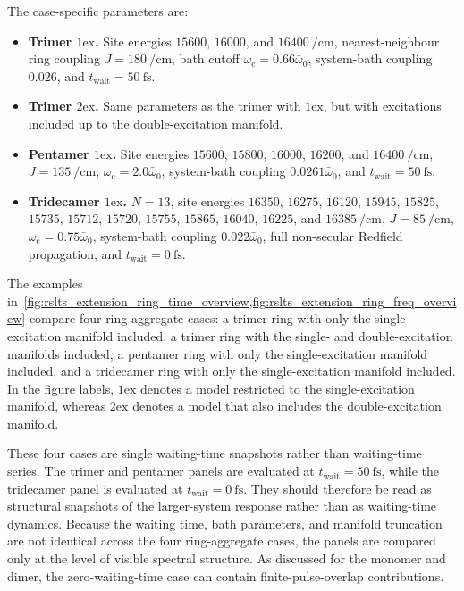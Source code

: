 The case-specific parameters are:
\begin{itemize}
\item \textbf{Trimer \(1\mathrm{ex}\).} Site energies \(15600\), \(16000\), and \(16400~\si{\per\centi\metre}\), nearest-neighbour ring coupling \(J=\SI{180}{\per\centi\metre}\), bath cutoff \(\omega_{\mathrm{c}}=0.66\bar{\omega}_0\), system-bath coupling \(0.026\), and \(t_{\mathrm{wait}}=\SI{50}{\femto\second}\).
\item \textbf{Trimer \(2\mathrm{ex}\).} Same parameters as the trimer with \(1\mathrm{ex}\), but with excitations included up to the double-excitation manifold.
\item \textbf{Pentamer \(1\mathrm{ex}\).} Site energies \(15600\), \(15800\), \(16000\), \(16200\), and \(16400~\si{\per\centi\metre}\), \(J=\SI{135}{\per\centi\metre}\), \(\omega_{\mathrm{c}}=2.0\bar{\omega}_0\), system-bath coupling \(0.0261\bar{\omega}_0\), and \(t_{\mathrm{wait}}=\SI{50}{\femto\second}\).
\item \textbf{Tridecamer \(1\mathrm{ex}\).} \(N=13\), site energies \(16350\), \(16275\), \(16120\), \(15945\), \(15825\), \(15735\), \(15712\), \(15720\), \(15755\), \(15865\), \(16040\), \(16225\), and \(16385~\si{\per\centi\metre}\), \(J=\SI{85}{\per\centi\metre}\), \(\omega_{\mathrm{c}}=0.75\bar{\omega}_0\), system-bath coupling \(0.022\bar{\omega}_0\), full non-secular Redfield propagation, and \(t_{\mathrm{wait}}=\SI{0}{\femto\second}\).
\end{itemize}

The examples in~\cref{fig:rslts_extension_ring_time_overview,fig:rslts_extension_ring_freq_overview} compare four ring-aggregate cases: a trimer ring with only the single-excitation manifold included, a trimer ring with the single- and double-excitation manifolds included, a pentamer ring with only the single-excitation manifold included, and a tridecamer ring with only the single-excitation manifold included. In the figure labels, \(1\mathrm{ex}\) denotes a model restricted to the single-excitation manifold, whereas \(2\mathrm{ex}\) denotes a model that also includes the double-excitation manifold.

These four cases are single waiting-time snapshots rather than waiting-time series. The trimer and pentamer panels are evaluated at \(t_{\mathrm{wait}}=\SI{50}{\femto\second}\), while the tridecamer panel is evaluated at \(t_{\mathrm{wait}}=\SI{0}{\femto\second}\). They should therefore be read as structural snapshots of the larger-system response rather than as waiting-time dynamics. Because the waiting time, bath parameters, and manifold truncation are not identical across the four ring-aggregate cases, the panels are compared only at the level of visible spectral structure. As discussed for the monomer and dimer, the zero-waiting-time case can contain finite-pulse-overlap contributions.


